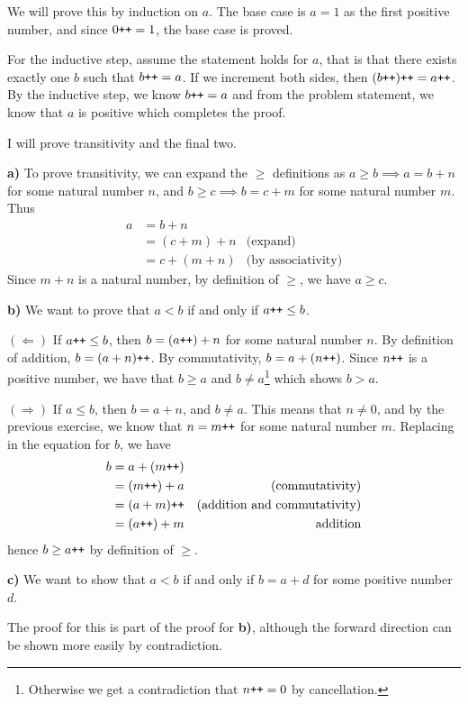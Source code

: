 We will prove this by induction on $a$. The base case is $a = 1$ as the first positive number, and since $0\texttt{++} = 1$, the base case is proved.

For the inductive step, assume the statement holds for $a$, that is that there exists exactly one $b$ such that $b\texttt{++} = a$. If we increment both sides, then $(b\texttt{++})\texttt{++} = a\texttt{++}$. By the inductive step, we know $b\texttt{++} = a$ and from the problem statement, we know that $a$ is positive which completes the proof.

I will prove transitivity and the final two.

\textbf{a)} To prove transitivity, we can expand the $\geq$ definitions as $a \geq b \implies a = b + n$ for some natural number $n$, and $b \geq c \implies b = c + m$ for some natural number $m$. Thus
\begin{align*}
  a &= b + n &\\
    &= (c + m) + n &\text{(expand)}\\
    &= c + (m + n) &\text{(by associativity)}
\end{align*}
Since $m + n$ is a natural number, by definition of $\geq$, we have $a \geq c$.

\textbf{b)} We want to prove that $a < b$ if and only if $a\texttt{++} \leq b$. 

$(\Leftarrow)$ If $a\texttt{++} \leq b$, then $b = (a\texttt{++}) + n$ for some natural number $n$. By definition of addition, $b = (a + n)\texttt{++}$. By commutativity, $b = a + (n\texttt{++})$. Since $n\texttt{++}$ is a positive number, we have that $b \geq a$ and $b\neq a$\footnote{Otherwise we get a contradiction that $n\texttt{++} = 0$ by cancellation.} which shows $b > a$.

$(\Rightarrow)$ If $a\leq b$, then $b = a + n$, and $b\neq a$. This means that $n\neq 0$, and by the previous exercise, we know that $n = m\texttt{++}$ for some natural number $m$. Replacing in the equation for $b$, we have 
\begin{align*}
  b &= a + (m\texttt{++}) &\\
    &= (m\texttt{++}) + a &\text{(commutativity)}\\
    &= (a + m)\texttt{++} &\text{(addition and commutativity)}\\
    &= (a\texttt{++}) + m &\text{addition}
\end{align*}
hence $b \geq a\texttt{++}$ by definition of $\geq$.

\textbf{c)} We want to show that $a < b$ if and only if $b = a + d$ for some positive number $d$.

The proof for this is part of the proof for \textbf{b)}, although the forward direction can be shown more easily by contradiction.
